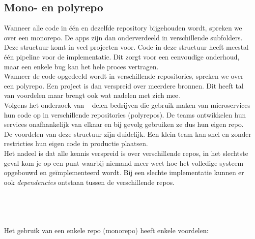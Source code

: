 \newpage
\subsection{Mono- en polyrepo}
Wanneer alle code in één en dezelfde repository bijgehouden wordt, spreken we over een monorepo. De apps zijn dan onderverdeeld in verschillende subfolders. Deze structuur komt in veel projecten voor. Code in deze structuur heeft meestal één pipeline voor de implementatie. Dit zorgt voor een eenvoudige onderhoud, maar een enkele bug kan het hele proces vertragen.\\ 
Wanneer de code opgedeeld wordt in verschillende repositories, spreken we over een polyrepo. Een project is dan verspreid over meerdere bronnen. Dit heeft tal van voordelen maar brengt ook wat nadelen met zich mee.\\
Volgens het onderzoek van ~\autocite{Powell2021} delen bedrijven die gebruik maken van microservices hun code op in verschillende repositories (polyrepos). De teams ontwikkelen hun services onafhankelijk van elkaar en bij gevolg gebruiken ze dus hun eigen repo. De voordelen van deze structuur zijn duidelijk. Een klein team kan snel en zonder restricties hun eigen code in productie plaatsen.\\  
Het nadeel is dat alle kennis verspreid is over verschillende repos, in het slechtste geval kom je op een punt waarbij niemand meer weet hoe het volledige systeem opgebouwd en geïmplementeerd wordt. Bij een slechte implementatie kunnen er ook \emph{dependencies} ontstaan tussen de verschillende repos. \\
\\
\\
\\
\\
Het gebruik van een enkele repo (monorepo) heeft enkele voordelen:
